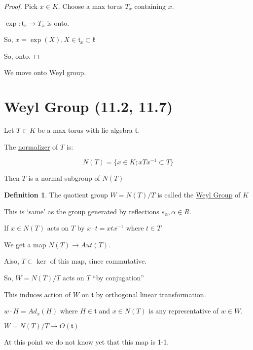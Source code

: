 \documentclass{article}
\theoremstyle{definition}
\newtheorem{definition}{Definition}
\begin{document}
\begin{proof}
    Pick \(x\in K\). Choose a max torus \(T_x\) containing \(x\).

    \(\exp: \mathfrak{t}_x \to T_x\) is onto.
    
    So, \(x=\exp(X), X\in \mathfrak{t}_x \subset \mathfrak{k}\) 

    So, onto.

\end{proof}

We move onto Weyl group.

\section*{Weyl Group (11.2, 11.7)}

Let \(T \subset K\) be a max torus with lie algebra \(\mathfrak{t}\).  

The \underline{normalizer} of \(T\) is:

\[
    N(T)=\{ x\in K ; x T x ^{-1} \subset T \} 
\]

Then \(T\) is a normal subgroup of \(N(T)\) 

\begin{definition}
    The quotient group \(W = N(T) / T\) is called the \underline{Weyl Group} of \(K\)  
\end{definition}

This is `same' as the group generated by reflections \(s_\alpha, \alpha \in R\).

If \(x\in N(T)\) acts on \(T\) by \(x\cdot t = x t x ^{-1}\) where \(t\in T\)

We get a map \(N(T)\to Aut(T)\).

Also, \(T \subset \ker\) of this map, since commutative.

So, \(W = N(T) / T\) acts on \(T\) ``by conjugation''

This induces action of \(W\) on \(\mathfrak{t}\) by orthogonal linear transformation.

\(w\cdot H = Ad_x (H)\) where \(H\in \mathfrak{t}\) and \(x\in N(T)\) is any representative of \(w\in W\).

\(W = N(T) / T \to O(\mathfrak{t})\) 

At this point we do not know yet that this map is 1-1.
\end{document}
